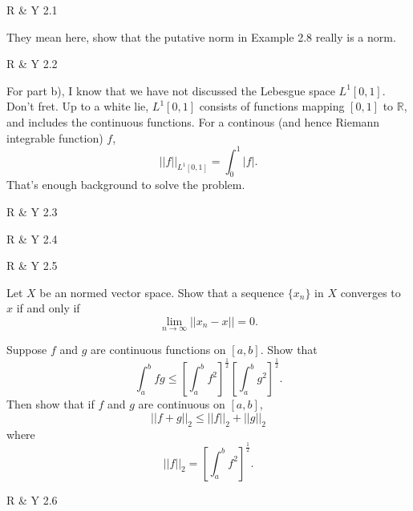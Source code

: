 \documentclass[minion]{homework}
\newcommand{\Reals}{\mathbb{R}}
\begin{document}
\begin{aproblems}

\hproblem R \& Y 2.1

They mean here, show that the putative norm in Example 2.8 really is a norm.

\hproblem R \& Y 2.2

For part b), I know that we have not discussed the Lebesgue space $L^1[0,1]$.  
Don't fret.  Up to a white lie, $L^1[0,1]$ consists of functions 
mapping $[0,1]$ to $\Reals$, and includes the continuous functions.  For
a continous (and hence Riemann integrable function) $f$,
\[
||f||_{L^1[0,1]} = \int_0^1 |f|.
\]
That's enough background to solve the problem.

\hproblem R \& Y 2.3

\hproblem R \& Y 2.4

\hproblem R \& Y 2.5

\hproblem Let $X$ be an normed vector space.  Show that a
sequence $\{x_n\}$ in $X$ converges to $x$ if and only if
\[
\lim_{n\rightarrow\infty} ||x_n-x||=0.
\]

\hproblem Suppose $f$ and $g$ are continuous functions on $[a,b]$.
Show that
\[
\int_a^b fg \le \left[\int_a^bf^2\right]^\frac 12 
\left[\int_a^bg^2\right]^\frac 12.
\]
Then show that if $f$ and $g$ are continuous on $[a,b]$,
\[
||f+g||_2 \le ||f||_2 + ||g||_2
\]
where
\[
||f||_2 = \left[\int_a^b f^2\right]^\frac 12 .
\]


\hproblem R \& Y 2.6

\end{aproblems}
\end{document}
